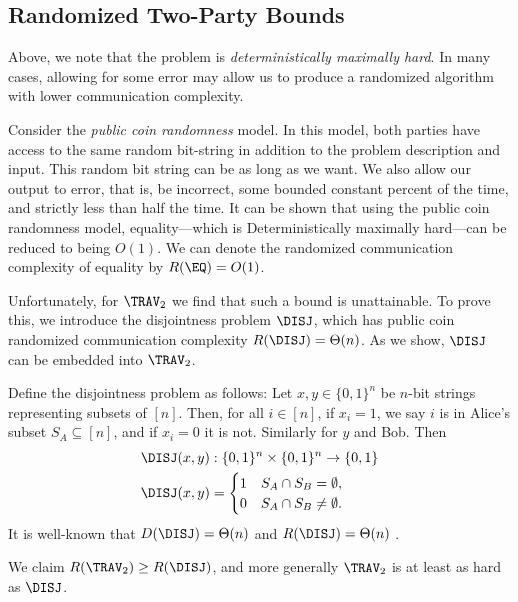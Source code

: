 \subsection{Randomized Two-Party Bounds}

Above, we note that the problem is \textit{deterministically maximally hard}. In many cases, allowing for some error may allow us to produce a randomized algorithm with lower communication complexity.

Consider the \textit{public coin randomness} model. In this model, both parties have access to the same random bit-string in addition to the problem description and input. This random bit string can be as long as we want. We also allow our output to error, that is, be incorrect, some bounded constant percent of the time, and strictly less than half the time. It can be shown that using the public coin randomness model, equality---which is Deterministically maximally hard---can be reduced to being $O(1)$. We can denote the randomized communication complexity of equality by $R(\EQ) = O(1)$.

Unfortunately, for $\TRAV_2$ we find that such a bound is unattainable. To prove this, we introduce the disjointness problem $\DISJ$, which has public coin randomized communication complexity $R(\DISJ) = \Theta(n)$. As we show, $\DISJ$ can be embedded into $\TRAV_2$.

\begin{definition}
\label{def:disj-two-party}
Define the disjointness problem as follows: Let $x,y \in \{0,1\}^n$ be $n$-bit strings representing subsets of $[n]$. Then, for all $i \in [n]$, if $x_i = 1$, we say $i$ is in Alice's subset $S_A \subseteq [n]$, and if $x_i = 0$ it is not. Similarly for $y$ and Bob. Then 
\begin{align}
    \DISJ(x,y) &: \{0,1\}^n \times \{0,1\}^n \to \{0,1\} \\
    \DISJ(x,y)&= \begin{cases}
        1 & S_A \cap S_B = \emptyset, \\
        0 & S_A \cap S_B \neq \emptyset.
    \end{cases}
\end{align}
It is well-known that $D(\DISJ) = \Theta(n)$ and $R(\DISJ) = \Theta(n)$ \parencite{RaoYehudayoffBook}. 
\end{definition}

\begin{claim}
\label{claim:disjoint-trav-bound}
We claim $R(\TRAV_2) \geq R(\DISJ)$, and more generally $\TRAV_2$ is at least as hard as $\DISJ$.
\end{claim}

